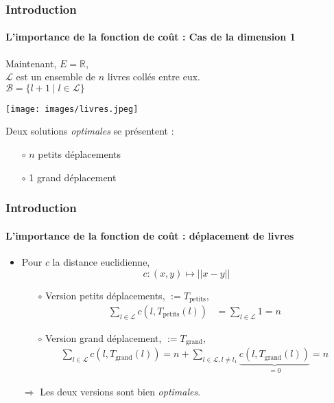 \documentclass{beamer}
\begin{document}
\begin{frame}
	\frametitle{Introduction}
	\framesubtitle{L'importance de la fonction de coût : Cas de la dimension 1} 
	Maintenant, $E = \mathbb{R}$,  \\ $\mathcal{L}$ est un ensemble de $n$ livres collés entre eux. \\
	 $\mathcal{B} = \{l + 1 \; | \; l \in \mathcal{L} \}$
	\begin{center}
		\texttt{[image: images/livres.jpeg]}
	\end{center}
	Deux solutions \emph{optimales} se présentent : \begin{itemize}
		\item[$\circ$] $n$ petits déplacements
		\item[$\circ$] 1 grand déplacement
	\end{itemize}
	
		

\end{frame}

\begin{frame}
	\frametitle{Introduction}
	\framesubtitle{L'importance de la fonction de coût : déplacement de livres} 
	\begin{itemize}
		\item Pour $c$ la distance euclidienne, \[c : (x,y) \mapsto ||x-y||\]
		\begin{itemize}
			\item[$\circ$] Version petits déplacements, $:= T_\text{petits}$, \begin{align*}
				\sum_{l \in \mathcal{L}} c(l,T_\text{petits}(l)) &= \sum_{l \in \mathcal{L}} 1 = n
			\end{align*}
			\item[$\circ$] Version grand déplacement, $:=T_\text{grand}$, \begin{align*}
				\sum_{l \in \mathcal{L}} c(l,T_\text{grand}(l)) = n + \sum_{l \in \mathcal{L}, l \neq l_1}\underbrace{c(l,T_\text{grand}(l))}_{=0} = n
			\end{align*}
		\end{itemize}
		\small $\Rightarrow$ Les deux versions sont bien \emph{optimales}.
	\end{itemize}
		

\end{frame}
\end{document}
